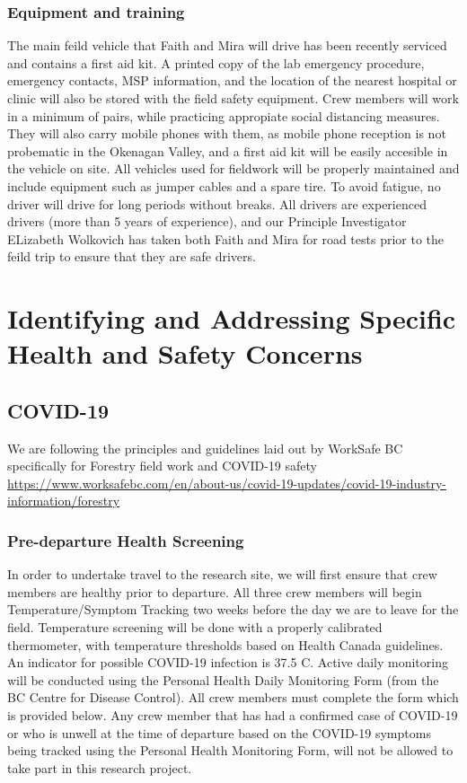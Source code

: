 \documentclass[11pt,letter]{article}
\begin{document}
\subsubsection{Equipment and training }
The main feild vehicle that Faith and Mira will drive has been recently serviced and contains a first aid kit. A printed copy of the lab emergency procedure, emergency contacts, MSP information, and the location of the nearest hospital or clinic will also be stored with the field safety equipment. Crew members will work in a minimum of pairs, while practicing appropiate social distancing measures. They will also carry mobile phones with them, as mobile phone reception is not probematic in the Okenagan Valley, and a first aid kit will be easily accesible in the vehicle on site. All vehicles used for fieldwork will be properly maintained and include equipment such as jumper cables and a spare tire. To avoid fatigue, no driver will drive for long periods without breaks. All drivers are experienced drivers (more than 5 years of experience), and our Principle Investigator ELizabeth Wolkovich has taken both Faith and Mira for road tests prior to the feild trip to ensure that they are safe drivers.  



\section{Identifying and Addressing Specific Health and Safety Concerns}

\subsection{COVID-19}

We are following the principles and guidelines laid out by WorkSafe BC specifically for Forestry field work and COVID-19 safety \url{https://www.worksafebc.com/en/about-us/covid-19-updates/covid-19-industry-information/forestry} 

\subsubsection {Pre-departure Health Screening}
In order to undertake travel to the research site, we will first ensure that crew members are healthy prior to departure. All three crew members will begin Temperature/Symptom Tracking two weeks before the day we are to leave for the field. Temperature screening will be done with a properly calibrated thermometer, with temperature thresholds based on Health Canada guidelines. An indicator for possible COVID-19 infection is 37.5 C. Active daily monitoring will be conducted using the Personal Health Daily Monitoring Form (from the BC Centre for Disease Control). All crew members must complete the form which is provided below. Any crew member that has had a confirmed case of COVID-19 or who is unwell at the time of departure based on the COVID-19 symptoms being tracked using the Personal Health Monitoring Form, will not be allowed to take part in this research project.
\end{document}
